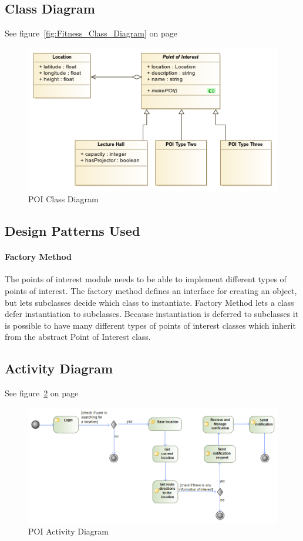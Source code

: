 \subsection{Class Diagram}
See figure~\ref{fig:Fitness_Class_Diagram} on page~\pageref{fig:Fitness_Class_Diagram}
\begin{figure}
	\centering
	\includegraphics[scale=0.54]{POI/poi_class_diagram.png}
	\caption{POI Class Diagram}
	\label{fig:POI_Class_Diagram}
\end{figure}

\subsection{Design Patterns Used}
    \paragraph{Factory Method}
    The points of interest module needs to be able to implement different types of points of interest. The factory method defines an interface for creating an object, but lets subclasses decide which class to instantiate. Factory Method lets a class defer instantiation to subclasses. Because instantiation is deferred to subclasses it is possible to have many different types of points of interest classes which inherit from the abstract Point of Interest class.
 
 \subsection{Activity Diagram}
See figure~\ref{fig:POI_Activity_Diagram} on page~\pageref{fig:POI_Activity_Diagram}
\begin{figure}
	\centering
	\includegraphics[scale=0.54]{POI/poi_activity_diagram.png}
	\caption{POI Activity Diagram}
	\label{fig:POI_Activity_Diagram}
\end{figure}

